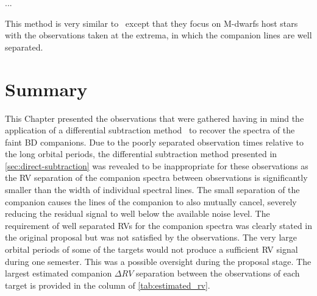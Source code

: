 ...

This method is very similar to~\citet{kostogryz_spectral_2013} except that they focus on M-dwarfs host stars with the observations taken at the extrema, in which the companion lines are well separated. 

\section{Summary}
This Chapter  presented the observations that were gathered having in mind the application of a differential subtraction method~\citep[e.g.][]{ferluga_separating_1997, kostogryz_spectral_2013} to recover the spectra of the faint {BD} companions.  Due to the poorly separated observation times relative to the long orbital periods, the differential subtraction method presented in \cref{sec:direct-subtraction} was revealed to be inappropriate for these observations as the {RV} separation of the companion spectra between observations is significantly smaller than the width of individual spectral lines.
The small separation of the companion causes the lines of the companion to also mutually cancel, severely reducing the residual signal to well below the available noise level.
The requirement of well separated RVs for the companion spectra was clearly stated in the original proposal but was not satisfied by the observations. {\red{} The very large orbital periods of some of the targets would not produce a sufficient {RV} signal during one semester.
This was a possible oversight during the proposal stage.} The largest estimated companion \(\Delta {RV}\) separation between the observations of each target is provided in the   column of \cref{tab:estimated_rv}. 
